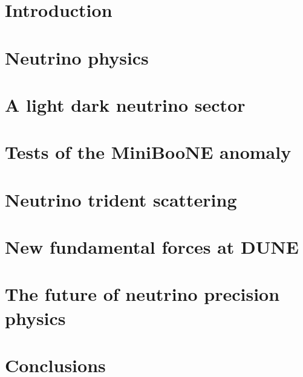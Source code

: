 \documentclass[openany,twoside,frontopenright]{ip3thesis}
\begin{document}
\chapter{Introduction}


\chapter{Neutrino physics}


\chapter{A light dark neutrino sector}


\chapter{Tests of the MiniBooNE anomaly}


\chapter{Neutrino trident scattering}


\chapter{New fundamental forces at DUNE}


\chapter{The future of neutrino precision physics}
%

\chapter{Conclusions}

\end{document}
